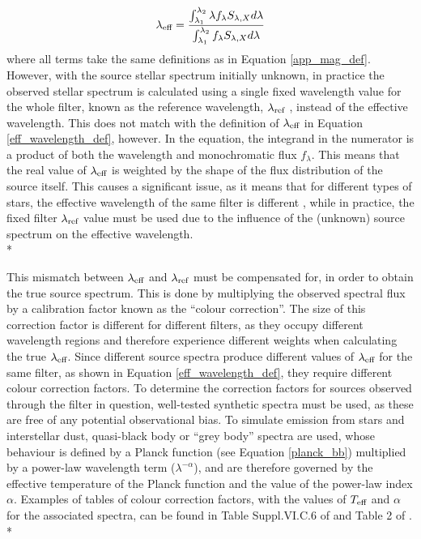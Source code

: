 \documentclass[12pt, a4paper]{report}
\begin{document}
\begin{equation}
\lambda_{\textnormal{eff}} = \frac{ \int_{\lambda_{1}}^{\lambda_{2}} \lambda f_{\lambda} S_{\lambda,X} d\lambda }{ \int_{\lambda_{1}}^{\lambda_{2}} f_{\lambda} S_{\lambda,X} d\lambda }
\label{eff_wavelength_def}
\end{equation}
where all terms take the same definitions as in Equation \ref{app_mag_def}. However, with the source stellar spectrum initially unknown, in practice the observed stellar spectrum is calculated using a single fixed wavelength value for the whole filter, known as the reference wavelength, $\lambda_{\textnormal{ref}}$ \citep{2006A&A...447..769P}, instead of the effective wavelength. This does not match with the definition of $\lambda_{\textnormal{eff}}$ in Equation \ref{eff_wavelength_def}, however. In the equation, the integrand in the numerator is a product of both the wavelength and monochromatic flux $f_{\lambda}$. This means that the real value of $\lambda_{\textnormal{eff}}$ is weighted by the shape of the flux distribution of the source itself. This causes a significant issue, as it means that for different types of stars, the effective wavelength of the same filter is different \citep{1988iras....1.....B}, while in practice, the fixed filter $\lambda_{\textnormal{ref}}$ value must be used due to the influence of the (unknown) source spectrum on the effective wavelength.\\*

This mismatch between $\lambda_{\textnormal{eff}}$ and $\lambda_{\textnormal{ref}}$ must be compensated for, in order to obtain the true source spectrum. This is done by multiplying the observed spectral flux by a calibration factor known as the ``colour correction''. The size of this correction factor is different for different filters, as they occupy different wavelength regions and therefore experience different weights when calculating the true $\lambda_{\textnormal{eff}}$. Since different source spectra produce different values of $\lambda_{\textnormal{eff}}$ for the same filter, as shown in Equation \ref{eff_wavelength_def}, they require different colour correction factors. To determine the correction factors for sources observed through the filter in question, well-tested synthetic spectra must be used, as these are free of any potential observational bias. To simulate emission from stars and interstellar dust, quasi-black body or ``grey body'' spectra are used, whose behaviour is defined by a Planck function (see Equation \ref{planck_bb}) multiplied by a power-law wavelength term ($\lambda^{-\alpha}$), and are therefore governed by the effective temperature of the Planck function and the value of the power-law index $\alpha$. Examples of tables of colour correction factors, with the values of $T_{\textnormal{eff}}$ and $\alpha$ for the associated spectra, can be found in Table Suppl.VI.C.6 of \cite{1988iras....1.....B} and Table 2 of \cite{2006A&A...447..769P}.\\*
\end{document}
